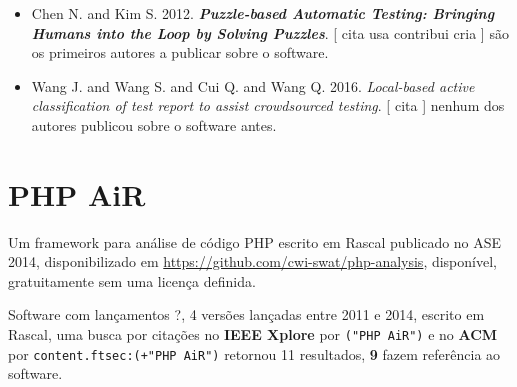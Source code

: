 \begin{itemize}
\item Chen N. and Kim S.
      2012.
        \textbf{\textit{ Puzzle-based Automatic Testing: Bringing Humans into the Loop by Solving Puzzles}}.
      [
          cita
          usa
          contribui
          cria
      ]
são os primeiros autores a publicar sobre o software.
\item Wang J. and Wang S. and Cui Q. and Wang Q.
      2016.
        \textit{ Local-based active classification of test report to assist crowdsourced testing}.
      [
          cita
      ]
nenhum dos autores publicou sobre o software antes.
\end{itemize}
\section{PHP AiR}

Um framework para análise de código PHP escrito em Rascal
publicado no ASE 2014,
disponibilizado em \url{https://github.com/cwi-swat/php-analysis},
disponível,
gratuitamente
sem uma licença definida.

Software com lançamentos ?,
4 versões lançadas
entre 2011 e 2014,
escrito em Rascal,
uma busca por citações no {\bf IEEE Xplore} por
\texttt{("PHP AiR")}
e no {\bf ACM} por
\texttt{content.ftsec:(+"PHP AiR")}
retornou
11 resultados,
{\bf 9} fazem referência ao software.

